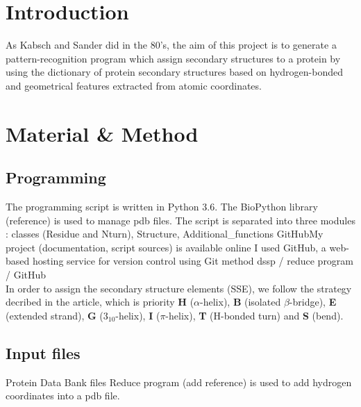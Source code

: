 \documentclass[12pt]{article}
\begin{document}
\maketitle

\section{Introduction}
As Kabsch and Sander did in the 80's, the aim of this project is to generate a pattern-recognition program which assign secondary structures to a protein by using the dictionary of protein secondary structures based on hydrogen-bonded and geometrical features extracted from atomic coordinates.

\section{Material \& Method}
\subsection{Programming}
The programming script is written in Python 3.6. The BioPython library (reference) is used to manage pdb files. The script is separated into three modules : classes (Residue and Nturn), Structure, Additional\_functions
GitHubMy project (documentation, script sources) is available online I used GitHub, a web-based hosting service for version control using Git
method dssp / reduce program / GitHub\\
In order to assign the secondary structure elements (SSE), we follow the strategy decribed in the article, which is priority \textbf{H} ($\alpha$-helix), \textbf{B} (isolated $\beta$-bridge), \textbf{E} (extended strand), \textbf{G} ($\textrm{3}_\textrm{10}$-helix), \textbf{I} ($\pi$-helix), \textbf{T} (H-bonded turn) and \textbf{S} (bend).  

\subsection{Input files}
Protein Data Bank files
Reduce program (add reference) is used to add hydrogen coordinates into a pdb file.
\end{document}
